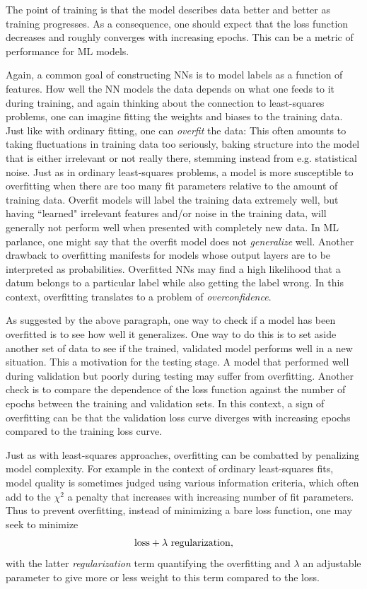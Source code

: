 The point of training is that the model describes data better and better as
training progresses. As a consequence, one should expect that the loss function
decreases and roughly converges with increasing epochs. This can be a metric of
performance for ML models.

Again, a common goal of constructing NNs is to model labels as a function of
features. How well the NN models the data depends on what one feeds to it during
training, and again thinking about the connection to least-squares problems,
one can imagine fitting the weights and biases to the training data. Just like
with ordinary fitting, one can {\it overfit} the data: This
often amounts to taking fluctuations in training data too seriously, baking structure
into the model that is either irrelevant or not really there, stemming instead
from e.g. statistical noise. Just as in ordinary least-squares problems,
a model is more susceptible to overfitting when there are too many fit
parameters relative to the amount of training data. 
Overfit models will label the training data
extremely well, but having ``learned" irrelevant features and/or noise in the
training data, will generally not perform well when presented with completely
new data. In ML parlance, one might say that the overfit model does not
{\it generalize} well. Another drawback to overfitting
manifests for models whose output layers are to be interpreted as probabilities.
Overfitted NNs may find a high likelihood that a datum belongs to a particular
label while also getting the label wrong. In this context, overfitting
translates to a problem of {\it overconfidence}.

As suggested by the above paragraph, one way to check if a model has been
overfitted is to see how well it generalizes. One way to do this is to set aside
another set of data to see if the trained, validated model performs well in a
new situation. This a motivation for the testing stage. A model that performed
well during validation but poorly during testing may suffer from overfitting.
Another check is to compare the dependence of the loss function against the
number of epochs between the training and validation sets. In this context, a
sign of overfitting can be that the validation loss curve diverges with increasing 
epochs compared to the training loss curve.

Just as with least-squares approaches, overfitting can be combatted by
penalizing model complexity. For example in the context of ordinary
least-squares fits, model quality is sometimes judged using various information
criteria, which often add to the $\chi^2$ a penalty that increases with
increasing number of fit parameters. Thus to prevent overfitting, instead of
minimizing a bare loss function, one may seek to minimize
\begin{equation}
{\rm loss}+\lambda~{\rm regularization},
\end{equation}
with the latter {\it regularization} term quantifying the
overfitting and $\lambda$ an adjustable parameter to give more or less weight to
this term compared to the loss.

